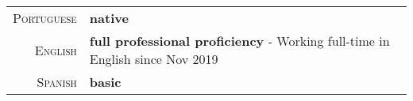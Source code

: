 %
%
%

\begin{tabular}{rl}
    \textsc{Portuguese} & \textbf{native} \\
    \textsc{English} & \textbf{full professional proficiency} - Working full-time in English since Nov 2019  \\
    \textsc{Spanish} & \textbf{basic} \\
\end{tabular}
